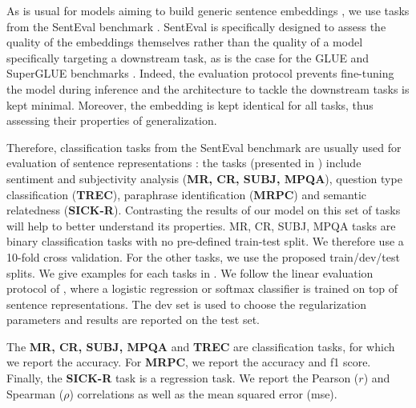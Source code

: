 As is usual for models aiming to build generic sentence embeddings \parencite{kiros_15, hill_16, arora_17, conneau_17, logeswaran_18, nie_19}, we use tasks from the SentEval benchmark \parencite{conneau_18}. SentEval is specifically designed to assess the quality of the embeddings themselves rather than the quality of a model specifically targeting a downstream task, as is the case for the GLUE and SuperGLUE benchmarks \parencite{wang_19_glue, wang_19_superglue}. Indeed, the evaluation protocol prevents fine-tuning the model during inference and the architecture to tackle the downstream tasks is kept minimal. Moreover, the embedding is kept identical for all tasks, thus assessing their properties of generalization. 

Therefore, classification tasks from the SentEval benchmark are usually used for evaluation of sentence representations \parencite{conneau_18}: the tasks (presented in ) include sentiment and subjectivity analysis (\textbf{MR, CR, SUBJ, MPQA}), question type classification (\textbf{TREC}), paraphrase identification (\textbf{MRPC}) and semantic relatedness (\textbf{SICK-R}). Contrasting the results of our model on this set of tasks will help to better understand its properties. MR, CR, SUBJ, MPQA tasks are binary classification tasks with no pre-defined train-test split. We therefore use a 10-fold cross validation. For the other tasks, we use the proposed train/dev/test splits. We give examples for each tasks in .
We follow the linear evaluation protocol of \textcite{kiros_15}, where a logistic regression or softmax classifier is trained on top of sentence representations. The dev set is used to choose the regularization parameters and results are reported on the test set. 

The \textbf{MR, CR, SUBJ, MPQA} and \textbf{TREC} are classification tasks, for which we report the accuracy. For \textbf{MRPC}, we report the accuracy and f1 score. Finally, the \textbf{SICK-R} task is a regression task. We report the Pearson ($r$) and Spearman ($\rho$) correlations as well as the mean squared error (mse).


